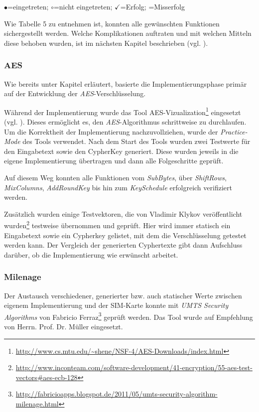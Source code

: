    \centerline{$\bullet$=eingetreten; $\circ$=nicht eingetreten; $\checkmark$=Erfolg; =Misserfolg}\vspace*{5mm}

\clearpage
    Wie Tabelle 5 zu entnehmen ist, konnten alle gewünschten Funktionen sichergestellt werden.
    Welche Komplikationen auftraten und mit welchen Mitteln diese behoben wurden, ist im
    nächsten Kapitel beschrieben (vgl. ).


		\subsubsection[AES (Schenkel)]{AES}
		Wie bereits unter Kapitel  erläutert, basierte die Implementierungsphase
		primär auf der Entwicklung der \textit{AES}-Verschlüsse\-lung. 

		Während der Implementierung wurde das Tool AES-Vizualization\footnote{\url{http://www.cs.mtu.edu/~shene/NSF-4/AES-Downloads/index.html}}
		eingesetzt (vgl. ).
		Dieses ermöglicht es, den \textit{AES}-Algorithmus schrittweise zu durchlaufen.
		Um die Korrektheit der Implementierung nachzuvollziehen, wurde der \textit{Practice-Mode}
		des Tools verwendet. Nach dem Start des Tools wurden zwei Testwerte für den
		Eingabetext sowie den CypherKey generiert. Diese wurden jeweils in die eigene
		Implementierung übertragen und dann alle Folgeschritte geprüft.

		Auf diesem Weg konnten alle Funktionen vom \textit{SubBytes}, über \textit{ShiftRows},
		\textit{MixColumns}, \textit{AddRoundKey} bis hin zum \textit{KeySchedule} erfolgreich verifiziert
		werden.

		Zusätzlich wurden einige Testvektoren, die von Vladimir Klykov veröffentlicht
		wurden\footnote{\url{http://www.inconteam.com/software-development/41-encryption/55-aes-test-vectors\#aes-ecb-128}}
		testweise übernommen und geprüft. Hier wird immer statisch ein Eingabetext sowie ein
		Cypherkey gelistet, mit dem die Verschlüsselung getestet werden kann. Der Vergleich
		der generierten Cyphertexte gibt dann Aufschluss darüber, ob die Implementierung
		wie erwünscht arbeitet.


		\subsubsection[Milenage (Schenkel)]{Milenage}
		Der Austausch verschiedener, generierter bzw. auch statischer Werte zwischen eigenem
		Implementierung und der SIM-Karte konnte mit \textit{UMTS Security Algorithms}
		von Fabricio Ferraz\footnote{\url{http://fabricioapps.blogspot.de/2011/05/umts-security-algorithm-milenage.html}}
		geprüft werden. Das Tool wurde auf Empfehlung von Herrn. Prof. Dr. Müller eingesetzt.

